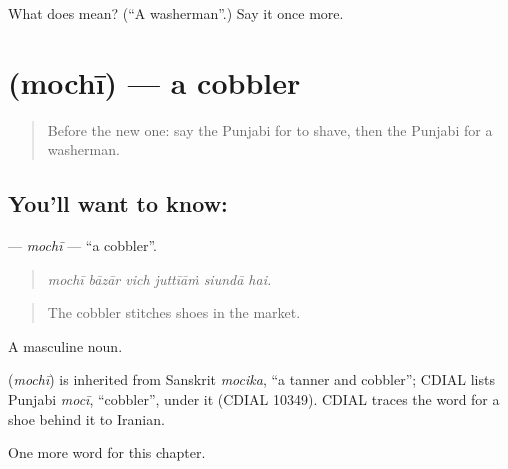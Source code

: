 \begin{tcolorbox}[breakable,colback=teal!4,colframe=teal!35!black,title={Before you move on}]
What does  mean? (\textquotedblleft{}A washerman\textquotedblright{}.) Say it once more.
\end{tcolorbox}
\section[\texorpdfstring{\pa{ਮੋਚੀ} (mochī)}{ਮੋਚੀ (mochī)}]{ (mochī) — a cobbler}

\label{lesson:PA-C333-mochi}



\begin{quote}
Before the new one: say the Punjabi for to shave, then the Punjabi for a washerman.
\end{quote}

\subsection*{You'll want to know: }
\textbf{} — \emph{mochī} — \textquotedblleft{}a cobbler\textquotedblright{}.

\begin{quote}
     
\end{quote}

\begin{quote}
\emph{mochī bāzār vich juttīāṁ siundā hai.}
\end{quote}

\begin{quote}
The cobbler stitches shoes in the market.
\end{quote}

A masculine noun.

\begin{cousinweb}
\textbf{} (\emph{mochī}) is inherited from Sanskrit \emph{mocika}, \textquotedblleft{}a tanner and cobbler\textquotedblright{}; CDIAL lists Punjabi \emph{mocī}, \textquotedblleft{}cobbler\textquotedblright{}, under it (CDIAL 10349). CDIAL traces the word for a shoe behind it to Iranian.
\end{cousinweb}

\begin{grammarlens}[title={What you've built}]
One more word for this chapter.
\end{grammarlens}

